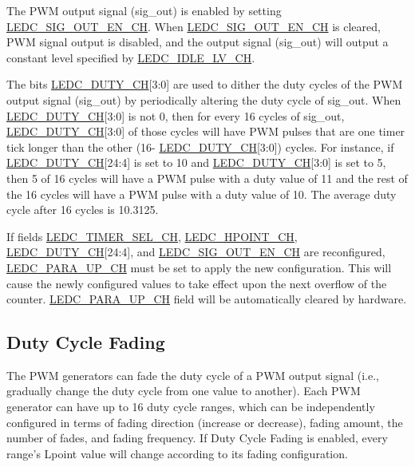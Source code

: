 \documentclass[main\_\_EN.tex]{subfiles}
\begin{document}
The PWM output signal (sig\_out) is enabled by setting \hyperref[fielddesc:LEDCSIGOUTENCHN]{LEDC\_SIG\_OUT\_EN\_CH}. When \hyperref[fielddesc:LEDCSIGOUTENCHN]{LEDC\_SIG\_OUT\_EN\_CH} is cleared, PWM signal output is disabled, and the output signal (sig\_out) will output a constant level specified by \hyperref[fielddesc:LEDCIDLELVCHN]{LEDC\_IDLE\_LV\_CH}.

The bits \hyperref[fielddesc:LEDCDUTYCHN]{LEDC\_DUTY\_CH}[3:0] are used to dither the duty cycles of the PWM output signal (sig\_out) by periodically altering the duty cycle of sig\_out. When \hyperref[fielddesc:LEDCDUTYCHN]{LEDC\_DUTY\_CH}[3:0] is not 0, then for every 16 cycles of sig\_out, \hyperref[fielddesc:LEDCDUTYCHN]{LEDC\_DUTY\_CH}[3:0] of those cycles will have PWM pulses that are one timer tick longer than the other (16- \hyperref[fielddesc:LEDCDUTYCHN]{LEDC\_DUTY\_CH}[3:0]) cycles. For instance, if \hyperref[fielddesc:LEDCDUTYCHN]{LEDC\_DUTY\_CH}[24:4] is set to 10 and \hyperref[fielddesc:LEDCDUTYCHN]{LEDC\_DUTY\_CH}[3:0] is set to 5, then 5 of 16 cycles will have a PWM pulse with a duty value of 11 and the rest of the 16 cycles will have a PWM pulse with a duty value of 10. The average duty cycle after 16 cycles is 10.3125.

If fields \hyperref[fielddesc:LEDCTIMERSELCHN]{LEDC\_TIMER\_SEL\_CH}, \hyperref[fielddesc:LEDCHPOINTCHN]{LEDC\_HPOINT\_CH}, \hyperref[fielddesc:LEDCDUTYCHN]{LEDC\_DUTY\_CH}[24:4], and \hyperref[fielddesc:LEDCSIGOUTENCHN]{LEDC\_SIG\_OUT\_EN\_CH} are reconfigured, \hyperref[fielddesc:LEDCPARAUPCHN]{LEDC\_PARA\_UP\_CH} must be set to apply the new configuration. This will cause the newly configured values to take effect upon the next overflow of the counter. \hyperref[fielddesc:LEDCPARAUPCHN]{LEDC\_PARA\_UP\_CH} field will be automatically cleared by hardware.

\subsection{Duty Cycle Fading}

The PWM generators can fade the duty cycle of a PWM output signal (i.e., gradually change the duty cycle from one value to another). Each PWM generator can have up to 16 duty cycle ranges, which can be independently configured in terms of fading direction (increase or decrease), fading amount, the number of fades, and fading frequency. If Duty Cycle Fading is enabled, every range's Lpoint value will change according to its fading configuration.
\end{document}
